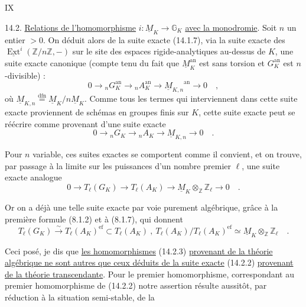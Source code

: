 \hfill IX

14.2. \uline{Relations de l'homomorphisme} $i\colon\underline M_K\longrightarrow\mathbb G_K$ \uline{avec la monodromie}. Soit $n$ un entier $>0$. On déduit alors de la suite exacte (14.1.7), via la suite exacte des $\underline{\operatorname{Ext}}^i(\mathbb Z/n\mathbb Z,-)$ sur le site des espaces rigide-analytiques au-dessus de $K$, une suite exacte canonique (compte tenu du fait que $\underline M_K^{\mathrm{an}}$ est sans torsion et $G_K^{\mathrm{an}}$ est $n$-divisible) :
\[
 0\longrightarrow{}_{n}G_K^{\mathrm{an}}\longrightarrow{}_{n}A_K^{\mathrm{an}}
 \longrightarrow{\underline M_{K,n}}^{\mathrm{an}}\longrightarrow0\quad,
\]
où $\underline M_{K,n}\overset{\mathrm{dfn}}{=}\underline M_K/n\underline M_K$. Comme tous les termes qui interviennent dans\handwritten{\unsure{$\vert$}} cette suite exacte proviennent de schémas en groupes finis sur $K$, cette suite exacte peut se réécrire comme provenant d'une suite exacte
\[
 0\longrightarrow{}_{n}G_K\longrightarrow{}_{n}A_K\longrightarrow\underline M_{K,n}\longrightarrow0\quad. \tag*{(14.2.1)}
\]

Pour $n$ variable, ces suites exactes se comportent comme il convient, et on trouve, par passage à la limite sur les puissances d'un nombre premier $\ell$, une suite exacte analogue
\[
 0\longrightarrow T_\ell(G_K)\longrightarrow T_\ell(A_K)\longrightarrow
 \underline M_K\otimes_{\mathbb Z}\mathbb Z_\ell\longrightarrow0\quad. \tag*{(14.2.2)}
\]

Or on a déjà une telle suite exacte par voie purement algébrique, grâce à la première formule (8.1.2) et à (8.1.7), qui donnent
\[
 T_\ell(G_K)\xrightarrow{\sim} T_\ell(A_K)^{\mathrm{ef}}\subset T_\ell(A_K)\ ,\
 T_\ell(A_K)/T_\ell(A_K)^{\mathrm{ef}}\simeq\underline M_K\otimes_{\mathbb Z}\mathbb Z_\ell\quad. \tag*{(14.2.3)}
\]

Ceci posé, je dis que \uline{les homomorphismes} (14.2.3) \uline{provenant de la théorie algébrique ne sont autres que ceux déduits de la suite exacte} (14.2.2) \uline{provenant de la théorie transcendante}. Pour le premier homomorphisme, correspondant au premier homomorphisme de (14.2.2)\unsure{,|;} notre assertion résulte aussitôt, par réduction à la situation semi-stable, de la



